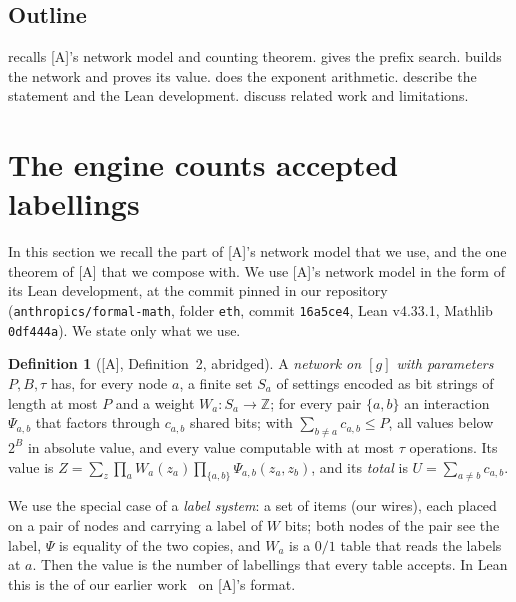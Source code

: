 \documentclass[10pt]{amsart}
\theoremstyle{plain}
\theoremstyle{definition}
\newtheorem{definition}[theorem]{Definition}
\theoremstyle{remark}
\numberwithin{equation}{section}
\newcommand{\A}{\textup{[A]}}
\newcommand{\Z}{\mathbb{Z}}
\begin{document}
\subsection*{Outline}
 recalls \A's network model and counting theorem.  gives the prefix
search.  builds the network and proves its value.  does the exponent
arithmetic.  describe the statement and the Lean development.
 discuss related work and limitations.

\section{The engine counts accepted labellings}\label{sec:engine}

In this section we recall the part of \A's network model that we use, and the one theorem of \A{} that
we compose with. We use \A's network model in the form of its Lean development, at the commit pinned in our
repository (\texttt{anthropics/formal-math}, folder \texttt{eth}, commit \texttt{16a5ce4}, Lean
v4.33.1, Mathlib \texttt{0df444a}). We state only what we use.

\begin{definition}[\A, Definition~2, abridged]\label{def:network}
A \emph{network on $[g]$ with parameters $P,B,\tau$} has, for every node $a$, a finite set $S_a$ of
settings encoded as bit strings of length at most $P$ and a weight $W_a\colon S_a\to\Z$; for every
pair $\{a,b\}$ an interaction $\Psi_{a,b}$ that factors through $c_{a,b}$ shared bits; with
$\sum_{b\ne a}c_{a,b}\le P$, all values below $2^B$ in absolute value, and every value computable with
at most $\tau$ operations. Its value is
$Z=\sum_{z}\prod_aW_a(z_a)\prod_{\{a,b\}}\Psi_{a,b}(z_a,z_b)$, and its \emph{total} is
$U=\sum_{a\ne b}c_{a,b}$.
\end{definition}

We use the special case of a \emph{label system}: a set of items (our wires), each placed on a pair
of nodes and carrying a label of $W$ bits; both nodes of the pair see the label, $\Psi$ is equality of
the two copies, and $W_a$ is a $0/1$ table that reads the labels at $a$. Then the value is the number
of labellings that every table accepts. In Lean this is the  of our earlier
work~\cite{Tulsyan26} on \A's  format.
\end{document}
